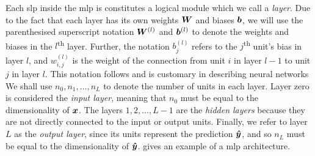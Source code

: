 \documentclass[../main.tex]{subfiles}
\begin{document}
Each \gls{slp} inside the \gls{mlp} is constitutes a logical module which we call a \emph{layer}.
Due to the fact that each layer has its own weights ${\bm{W}}$ and biases ${\bm{b}}$, we will use the parenthesised superscript notation ${\bm{W}}^{(l)}$ and ${\bm{b}}^{(l)}$ to denote the weights and biases in the $l$\textsuperscript{th} layer.
Further, the notation $b_j^{(l)}$ refers to the $j$\textsuperscript{th} unit's bias in layer $l$, and $w_{i,j}^{(l)}$ is the weight of the connection from unit $i$ in layer $l-1$ to unit $j$ in layer $l$.
This notation follows \textcite{goodfellow2016} and is customary in describing neural networks
We shall use $n_0,n_1,\dots,n_L$ to denote the number of units in each layer.
Layer zero is considered the \emph{input layer}, meaning that $n_0$ must be equal to the dimensionality of ${\bm{x}}$. 
The layers $1, 2, \dots, L-1$ are the \emph{hidden layers} because they are not directly connected to the input or output units.
Finally, we refer to layer $L$ as the \emph{output layer}, since its units represent the prediction ${\bm{\hat{y}}}$, and so $n_L$ must be equal to the dimensionality of ${\bm{\hat{y}}}$. 
 gives an example of a \gls{mlp} architecture.
\end{document}
